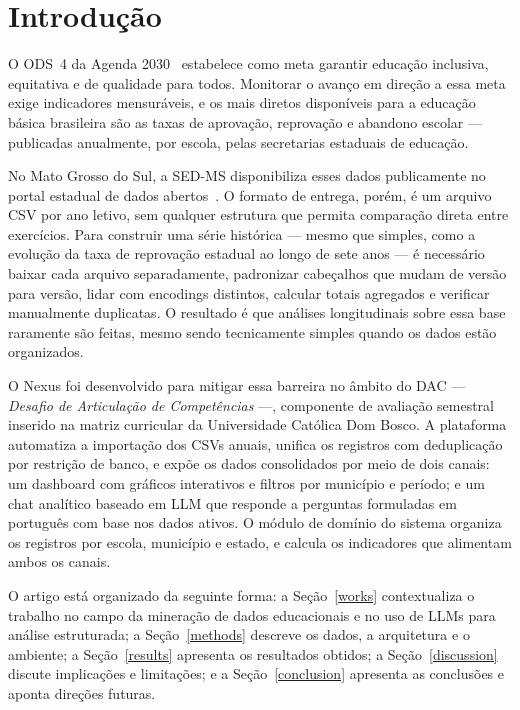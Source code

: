\documentclass[preprint,10pt,5p]{elsarticle}
\begin{document}
\section{Introdução}
\label{intro}

O ODS~4 da Agenda 2030~\cite{onu2015} estabelece como meta garantir educação inclusiva,
equitativa e de qualidade para todos. Monitorar o avanço em direção a essa meta exige
indicadores mensuráveis, e os mais diretos disponíveis para a educação básica brasileira
são as taxas de aprovação, reprovação e abandono escolar — publicadas anualmente, por escola,
pelas secretarias estaduais de educação.

No Mato Grosso do Sul, a SED-MS disponibiliza esses dados publicamente no portal estadual de
dados abertos~\cite{seduc_ms}. O formato de entrega, porém, é um arquivo CSV por ano letivo,
sem qualquer estrutura que permita comparação direta entre exercícios. Para construir uma
série histórica — mesmo que simples, como a evolução da taxa de reprovação estadual ao longo
de sete anos — é necessário baixar cada arquivo separadamente, padronizar cabeçalhos que
mudam de versão para versão, lidar com encodings distintos, calcular totais agregados e
verificar manualmente duplicatas. O resultado é que análises longitudinais sobre essa base
raramente são feitas, mesmo sendo tecnicamente simples quando os dados estão organizados.

O Nexus foi desenvolvido para mitigar essa barreira no âmbito do DAC —
\textit{Desafio de Articulação de Competências} —, componente de avaliação semestral inserido
na matriz curricular da Universidade Católica Dom Bosco. A plataforma automatiza a importação
dos CSVs anuais, unifica os registros com deduplicação por restrição de banco, e expõe os
dados consolidados por meio de dois canais: um dashboard com gráficos interativos e filtros
por município e período; e um chat analítico baseado em LLM que responde a perguntas
formuladas em português com base nos dados ativos. O módulo de domínio do sistema organiza
os registros por escola, município e estado, e calcula os indicadores que alimentam ambos
os canais.

O artigo está organizado da seguinte forma: a Seção~\ref{works} contextualiza o trabalho no
campo da mineração de dados educacionais e no uso de LLMs para análise estruturada; a
Seção~\ref{methods} descreve os dados, a arquitetura e o ambiente; a Seção~\ref{results}
apresenta os resultados obtidos; a Seção~\ref{discussion} discute implicações e limitações;
e a Seção~\ref{conclusion} apresenta as conclusões e aponta direções futuras.
\end{document}
